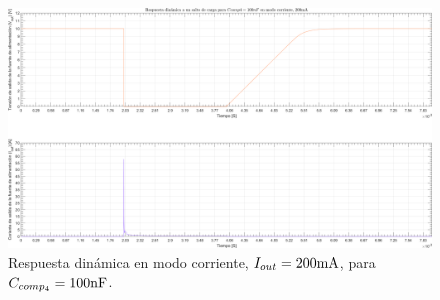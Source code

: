 \clearpage

\begin{figure}[H] %
\begin{center}
\includegraphics[width=1.1 \textwidth, angle=90]{./img/plots/dynamic/power_supply_CCOMP4_100n_STEP_Modo4.png}
\caption{\label{fig:fig_power_supply_CCOMP4_STEP_100n_Modo4}\footnotesize{Respuesta dinámica en modo corriente, $I_{out} = 200 \si[per-mode=symbol]{\milli\ampere}$, para $C_{comp_{4}} = 100 \si[per-mode=symbol]{\nano\farad} $.}}
\end{center}
\end{figure}

\clearpage




